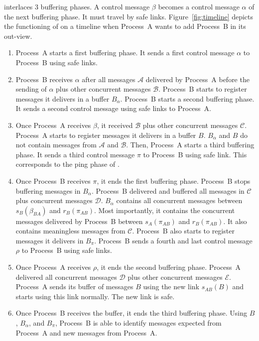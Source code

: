 \RPCBROADCAST interlaces 3 buffering phases. A control message $\beta$ becomes a
control message $\alpha$ of the next buffering phase. It must travel by safe
links. Figure~\ref{fig:timeline} depicts the functioning of \RPCBROADCAST on a
timeline when Process~A wants to add Process~B in its out-view. 
\begin{enumerate}[leftmargin=*]
\item Process~A starts a first buffering phase. It sends a first control message
  $\alpha$ to Process~B using safe links. 
\item Process~B receives $\alpha$ after all messages $\mathcal{A}$ delivered by
  Process~A before the sending of $\alpha$ plus other concurrent messages
  $\mathcal{B}$.  Process~B starts to register messages it delivers in a buffer
  $B_\alpha$.  Process~B starts a second buffering phase. It sends a second
  control message using safe links to Process~A.
\item Once Process~A receives $\beta$, it received $\mathcal{B}$ plus other
  concurrent messages $\mathcal{C}$. Process~A starts to register messages it
  delivers in a buffer $B$. $B_\alpha$ and $B$ do not contain messages from
  $\mathcal{A}$ and $\mathcal{B}$.
  Then, Process~A starts a third buffering phase. It sends a third control
  message $\pi$ to Process~B using safe link. This corresponds to the ping phase
  of \PCBROADCAST.
\item Once Process~B receives $\pi$, it ends the first buffering phase.
  Process~B stops buffering messages in $B_\alpha$. Process~B delivered and
  buffered all messages in $\mathcal{C}$ plus concurrent messages
  $\mathcal{D}$. $B_\alpha$ contains all concurrent messages between
  $s_B(\beta_{BA})$ and $r_B(\pi_{AB})$. Most importantly, it contains the
  concurrent messages delivered by Process~B between $s_A(\pi_{AB})$ and
  $r_B(\pi_{AB})$. It also contains meaningless messages from $\mathcal{C}$.
  Process~B also starts to register messages it delivers in $B_\pi$.
  Process~B sends a fourth and last control message $\rho$ to Process~B
  using safe links. 
\item Once Process~A receives $\rho$, it ends the second buffering
  phase. Process~A delivered all concurrent messages $\mathcal{D}$ plus other
  concurrent messages $\mathcal{E}$. Process~A sends its buffer of messages $B$
  using the new link $s_{AB}(B)$ and starts using this link normally. The new
  link is safe.
\item Once Process~B receives the buffer, it ends the third buffering
  phase. Using $B$, $B_\alpha$, and $B_\pi$, Process~B is able to identify
  messages expected from Process~A and new messages from Process~A.


\end{enumerate}
